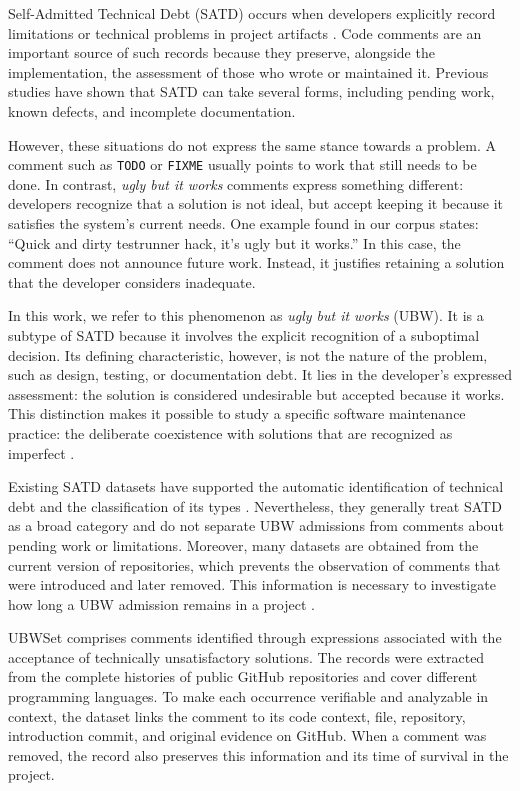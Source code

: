 \documentclass[10pt,conference]{IEEEtran}
\begin{document}
Self-Admitted Technical Debt (SATD) occurs when developers explicitly record limitations or technical problems in project artifacts \cite{potdar2014exploratory,maldonado2015detecting}. Code comments are an important source of such records because they preserve, alongside the implementation, the assessment of those who wrote or maintained it. Previous studies have shown that SATD can take several forms, including pending work, known defects, and incomplete documentation.

However, these situations do not express the same stance towards a problem. A comment such as \texttt{TODO} or \texttt{FIXME} usually points to work that still needs to be done. In contrast, \emph{ugly but it works} comments express something different: developers recognize that a solution is not ideal, but accept keeping it because it satisfies the system's current needs. One example found in our corpus states: ``Quick and dirty testrunner hack, it's ugly but it works.'' In this case, the comment does not announce future work. Instead, it justifies retaining a solution that the developer considers inadequate.

In this work, we refer to this phenomenon as \emph{ugly but it works} (UBW). It is a subtype of SATD because it involves the explicit recognition of a suboptimal decision. Its defining characteristic, however, is not the nature of the problem, such as design, testing, or documentation debt. It lies in the developer's expressed assessment: the solution is considered undesirable but accepted because it works. This distinction makes it possible to study a specific software maintenance practice: the deliberate coexistence with solutions that are recognized as imperfect \cite{maipradit2020wait}.

Existing SATD datasets have supported the automatic identification of technical debt and the classification of its types \cite{huang2018textmining}. Nevertheless, they generally treat SATD as a broad category and do not separate UBW admissions from comments about pending work or limitations. Moreover, many datasets are obtained from the current version of repositories, which prevents the observation of comments that were introduced and later removed. This information is necessary to investigate how long a UBW admission remains in a project \cite{maldonado2017removal}.

UBWSet comprises comments identified through expressions associated with the acceptance of technically unsatisfactory solutions. The records were extracted from the complete histories of public GitHub repositories and cover different programming languages. To make each occurrence verifiable and analyzable in context, the dataset links the comment to its code context, file, repository, introduction commit, and original evidence on GitHub. When a comment was removed, the record also preserves this information and its time of survival in the project.
\end{document}
